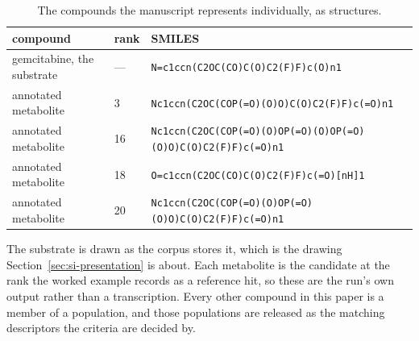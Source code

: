 \begin{table}[h]
\centering\scriptsize
\begin{threeparttable}
\caption{The compounds the manuscript represents individually, as structures.}
\label{tab:si-worked-structures}
\begin{tabular}{@{}llp{}@{}}
\toprule
compound & rank & SMILES \\
\midrule
gemcitabine, the substrate & --- & \texttt{N=\allowbreak{}c1ccn(\allowbreak{}C2OC(\allowbreak{}CO)\allowbreak{}C(\allowbreak{}O)\allowbreak{}C2(\allowbreak{}F)\allowbreak{}F)\allowbreak{}c(\allowbreak{}O)\allowbreak{}n1} \\
annotated metabolite & 3 & \texttt{Nc1ccn(\allowbreak{}C2OC(\allowbreak{}COP(\allowbreak{}=\allowbreak{}O)\allowbreak{}(\allowbreak{}O)\allowbreak{}O)\allowbreak{}C(\allowbreak{}O)\allowbreak{}C2(\allowbreak{}F)\allowbreak{}F)\allowbreak{}c(\allowbreak{}=\allowbreak{}O)\allowbreak{}n1} \\
annotated metabolite & 16 & \texttt{Nc1ccn(\allowbreak{}C2OC(\allowbreak{}COP(\allowbreak{}=\allowbreak{}O)\allowbreak{}(\allowbreak{}O)\allowbreak{}OP(\allowbreak{}=\allowbreak{}O)\allowbreak{}(\allowbreak{}O)\allowbreak{}OP(\allowbreak{}=\allowbreak{}O)\allowbreak{}(\allowbreak{}O)\allowbreak{}O)\allowbreak{}C(\allowbreak{}O)\allowbreak{}C2(\allowbreak{}F)\allowbreak{}F)\allowbreak{}c(\allowbreak{}=\allowbreak{}O)\allowbreak{}n1} \\
annotated metabolite & 18 & \texttt{O=\allowbreak{}c1ccn(\allowbreak{}C2OC(\allowbreak{}CO)\allowbreak{}C(\allowbreak{}O)\allowbreak{}C2(\allowbreak{}F)\allowbreak{}F)\allowbreak{}c(\allowbreak{}=\allowbreak{}O)\allowbreak{}[nH]1} \\
annotated metabolite & 20 & \texttt{Nc1ccn(\allowbreak{}C2OC(\allowbreak{}COP(\allowbreak{}=\allowbreak{}O)\allowbreak{}(\allowbreak{}O)\allowbreak{}OP(\allowbreak{}=\allowbreak{}O)\allowbreak{}(\allowbreak{}O)\allowbreak{}O)\allowbreak{}C(\allowbreak{}O)\allowbreak{}C2(\allowbreak{}F)\allowbreak{}F)\allowbreak{}c(\allowbreak{}=\allowbreak{}O)\allowbreak{}n1} \\
\bottomrule
\end{tabular}
\begin{tablenotes}[flushleft]\footnotesize
\item The substrate is drawn as the corpus stores it, which is the drawing Section~\ref{sec:si-presentation} is about. Each metabolite is the candidate at the rank the worked example records as a reference hit, so these are the run's own output rather than a transcription. Every other compound in this paper is a member of a population, and those populations are released as the matching descriptors the criteria are decided by.
\end{tablenotes}
\end{threeparttable}
\end{table}
